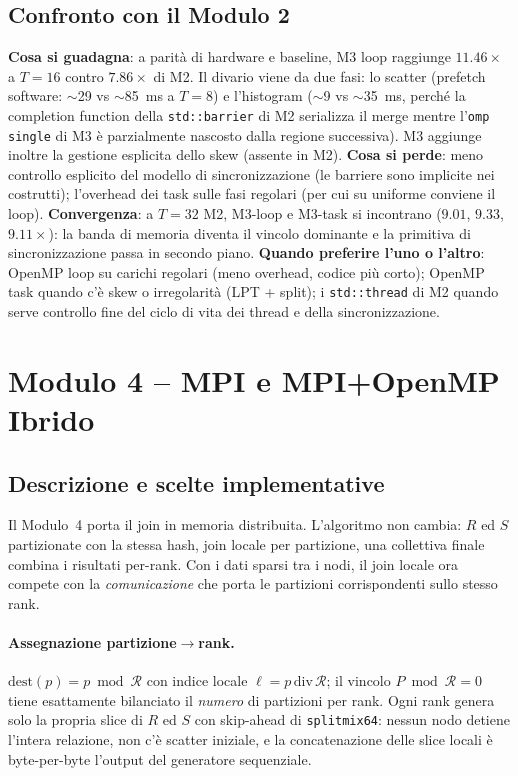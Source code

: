 \documentclass[11pt,a4paper]{article}
\theoremstyle{remark}
\begin{document}
\subsection{Confronto con il Modulo 2}

\textbf{Cosa si guadagna}: a parit\`a di hardware e baseline, M3 loop raggiunge $11.46\times$ a $T=16$ contro $7.86\times$ di M2. Il divario viene da due fasi: lo scatter (prefetch software: $\sim$29 vs $\sim$85~ms a $T=8$) e l'histogram ($\sim$9 vs $\sim$35~ms, perch\'e la completion function della \texttt{std::barrier} di M2 serializza il merge mentre l'\texttt{omp single} di M3 \`e parzialmente nascosto dalla regione successiva). M3 aggiunge inoltre la gestione esplicita dello skew (assente in M2). \textbf{Cosa si perde}: meno controllo esplicito del modello di sincronizzazione (le barriere sono implicite nei costrutti); l'overhead dei task sulle fasi regolari (per cui su uniforme conviene il loop). \textbf{Convergenza}: a $T=32$ M2, M3-loop e M3-task si incontrano ($9.01$, $9.33$, $9.11\times$): la banda di memoria diventa il vincolo dominante e la primitiva di sincronizzazione passa in secondo piano. \textbf{Quando preferire l'uno o l'altro}: OpenMP loop su carichi regolari (meno overhead, codice pi\`u corto); OpenMP task quando c'\`e skew o irregolarit\`a (LPT + split); i \texttt{std::thread} di M2 quando serve controllo fine del ciclo di vita dei thread e della sincronizzazione.


\section{Modulo 4 -- MPI e MPI+OpenMP Ibrido}
\label{sec:m4}

\subsection{Descrizione e scelte implementative}

Il Modulo~4 porta il join in memoria distribuita. L'algoritmo non cambia: $R$ ed $S$ partizionate con la stessa hash, join locale per partizione, una collettiva finale combina i risultati per-rank. Con i dati sparsi tra i nodi, il join locale ora compete con la \emph{comunicazione} che porta le partizioni corrispondenti sullo stesso rank.

\paragraph{Assegnazione partizione$\to$rank.} $\text{dest}(p)=p\bmod\mathcal{R}$ con indice locale $\ell=p\,\text{div}\,\mathcal{R}$; il vincolo $P\bmod\mathcal{R}=0$ tiene esattamente bilanciato il \emph{numero} di partizioni per rank. Ogni rank genera solo la propria slice di $R$ ed $S$ con skip-ahead di \texttt{splitmix64}: nessun nodo detiene l'intera relazione, non c'\`e scatter iniziale, e la concatenazione delle slice locali \`e byte-per-byte l'output del generatore sequenziale.
\end{document}
